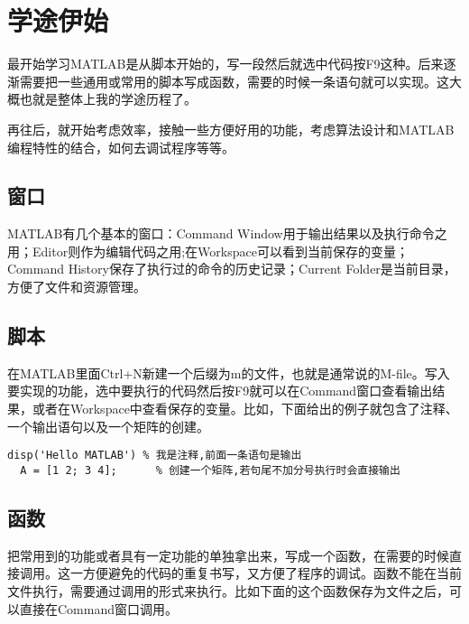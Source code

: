﻿\section{学途伊始}
\setcounter{page}{1}

最开始学习MATLAB是从脚本开始的，写一段然后就选中代码按F9这种。后来逐渐需要把一些通用或常用的脚本写成函数，需要的时候一条语句就可以实现。这大概也就是整体上我的学途历程了。\par

再往后，就开始考虑效率，接触一些方便好用的功能，考虑算法设计和MATLAB编程特性的结合，如何去调试程序等等。





\subsection{窗口}

MATLAB有几个基本的窗口：Command Window用于输出结果以及执行命令之用；Editor则作为编辑代码之用;在Workspace可以看到当前保存的变量；Command History保存了执行过的命令的历史记录；Current Folder是当前目录，方便了文件和资源管理。





\subsection{脚本}

在MATLAB里面Ctrl+N新建一个后缀为m的文件，也就是通常说的M-file。写入要实现的功能，选中要执行的代码然后按F9就可以在Command窗口查看输出结果，或者在Workspace中查看保存的变量。比如，下面给出的例子就包含了注释、一个输出语句以及一个矩阵的创建。

\vspace{-0.8cm}
\begin{lstlisting}[caption=第一个脚本]
  disp('Hello MATLAB') % 我是注释,前面一条语句是输出
  A = [1 2; 3 4];      % 创建一个矩阵,若句尾不加分号执行时会直接输出
\end{lstlisting}





\subsection{函数}

把常用到的功能或者具有一定功能的单独拿出来，写成一个函数，在需要的时候直接调用。这一方便避免的代码的重复书写，又方便了程序的调试。函数不能在当前文件执行，需要通过调用的形式来执行。比如下面的这个函数保存为文件之后，可以直接在Command窗口调用。

